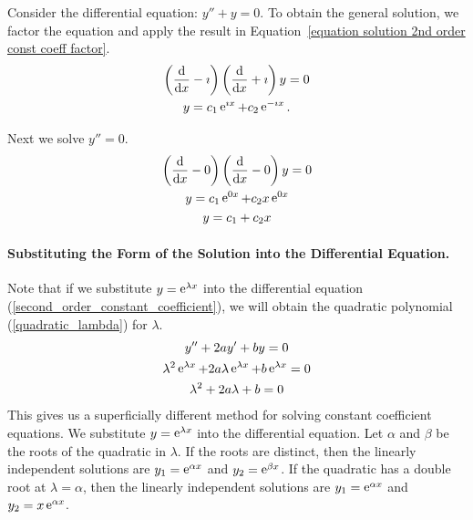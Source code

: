 \begin{Example}
  Consider the differential equation: $y'' + y = 0$.  
  To obtain the general solution, we factor the equation and apply the 
  result in Equation~\ref{equation solution 2nd order const coeff factor}.
  \begin{gather*}
    \left( \frac{\mathrm{d}}{\mathrm{d} x} - \imath \right) 
    \left( \frac{\mathrm{d}}{\mathrm{d} x} + \imath \right) y = 0
    \\
    y = c_1 \mathop{\mathrm{e}}\nolimits^{\imath x} + c_2 \mathop{\mathrm{e}}\nolimits^{-\imath x}.
  \end{gather*}
\end{Example}







\begin{Example}
  Next we solve $y'' = 0$.
  \begin{gather*}
    \left( \frac{\mathrm{d}}{\mathrm{d} x} - 0 \right) 
    \left( \frac{\mathrm{d}}{\mathrm{d} x} - 0 \right) y = 0
    \\
    y = c_1 \mathop{\mathrm{e}}\nolimits^{0 x} + c_2 x \mathop{\mathrm{e}}\nolimits^{0 x} 
    \\
    y = c_1 + c_2 x
  \end{gather*}
\end{Example}






\paragraph{Substituting the Form of the Solution into the Differential 
  Equation.}
Note that if we substitute $y = \mathop{\mathrm{e}}\nolimits^{\lambda x}$ into the differential 
equation (\ref{second_order_constant_coefficient}), we will obtain the 
quadratic polynomial (\ref{quadratic_lambda}) for $\lambda$.
\begin{gather*}
  y'' + 2 a y' + b y = 0 
  \\
  \lambda^2 \mathop{\mathrm{e}}\nolimits^{\lambda x} + 2 a \lambda \mathop{\mathrm{e}}\nolimits^{\lambda x} + b \mathop{\mathrm{e}}\nolimits^{\lambda x} = 0 
  \\
  \lambda^2 + 2 a \lambda + b = 0
\end{gather*}
This gives us a superficially different method for solving constant 
coefficient equations.
We substitute $y = \mathop{\mathrm{e}}\nolimits^{\lambda x}$ into the differential equation.
Let $\alpha$ and $\beta$ be the roots of the quadratic in $\lambda$.  If
the roots are distinct, then the linearly independent solutions are
$y_1 = \mathop{\mathrm{e}}\nolimits^{\alpha x}$ and $y_2 = \mathop{\mathrm{e}}\nolimits^{\beta x}$.  If the quadratic has 
a double root at $\lambda = \alpha$, then the linearly independent solutions
are $y_1 = \mathop{\mathrm{e}}\nolimits^{\alpha x}$ and $y_2 = x \mathop{\mathrm{e}}\nolimits^{\alpha x}$.




